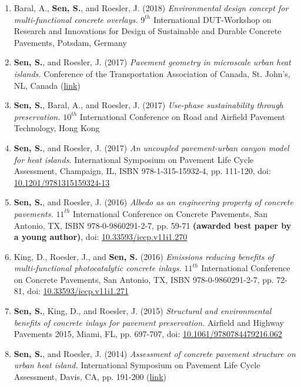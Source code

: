 \documentclass[12pt]{article}
\begin{document}
\begin{enumerate}
	\item Baral, A., \textbf{Sen, S.}, and Roesler, J. (2018) \textit{Environmental design concept for multi-functional concrete overlays.} $9^{th}$ International DUT-Workshop on Research and Innovations for Design of Sustainable and Durable Concrete Pavements, Potsdam, Germany
	\item \textbf{Sen, S.}, and Roesler, J. (2017) \textit{Pavement geometry in microscale urban heat islands.} Conference of the Transportation Association of Canada, St. John’s, NL, Canada (\href{http://www.tac-atc.ca/sites/default/files/conf_papers/sens_-_pavement_geometry_in_microscale_urban_heat_islands.pdf}{link})
	\item \textbf{Sen, S.}, Baral, A., and Roesler, J. (2017) \textit{Use-phase sustainability through preservation.} $10^{th}$ International Conference on Road and Airfield Pavement Technology, Hong Kong
	\item \textbf{Sen, S.}, and Roesler, J. (2017) \textit{An uncoupled pavement-urban canyon model for heat islands.} International Symposium on Pavement Life Cycle Assessment, Champaign, IL, ISBN 978-1-315-15932-4, pp. 111-120, doi: \href{http://dx.doi.org/10.1201/9781315159324-13}{10.1201/9781315159324-13}
	\item \textbf{Sen, S.}, and Roesler, J. (2016) \textit{Albedo as an engineering property of concrete pavements.} $11^{th}$ International Conference on Concrete Pavements, San Antonio, TX, ISBN 978-0-9860291-2-7, pp. 59-71 \textbf{(awarded best paper by a young author)}, doi: \href{http://dx.doi.org/10.33593/iccp.v11i1.270}{10.33593/iccp.v11i1.270}
	\item King, D., Roesler, J., and \textbf{Sen, S.} (2016) \textit{Emissions reducing benefits of multi-functional photocatalytic concrete inlays.} $11^{th}$ International Conference on Concrete Pavements, San Antonio, TX, ISBN 978-0-9860291-2-7, pp. 72-81, doi: \href{http://dx.doi.org/10.33593/iccp.v11i1.271}{10.33593/iccp.v11i1.271}
	\item \textbf{Sen, S.}, King, D., and Roesler, J. (2015) \textit{Structural and environmental benefits of concrete inlays for pavement preservation.} Airfield and Highway Pavements 2015, Miami, FL, pp. 697-707, doi: \href{http://dx.doi.org/10.1061/9780784479216.062}{10.1061/9780784479216.062}
	\item \textbf{Sen, S.}, and Roesler, J. (2014) \textit{Assessment of concrete pavement structure on urban heat island.} International Symposium on Pavement Life Cycle Assessment, Davis, CA, pp. 191-200 (\href{http://www.ucprc.ucdavis.edu/p-LCA2014/media/pdf/Papers/LCA14_Urban\%20Heat\%20Island.pdf}{link})
\end{enumerate}
\end{document}
